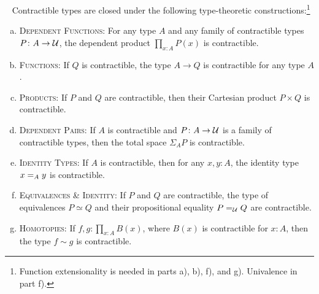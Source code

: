 \begin{thm}\fe\ \ua\label{thm:contractible-types}
    Contractible types are closed under the following type-theoretic constructions:\footnote{Function extensionality is needed in parts a), b), f), and g). Univalence in part f).}
    \begin{enumerate}[a),font=\upshape]
        \item \textsc{\upshape Dependent Functions:} For any type\/ $A$ and any family of contractible types\/ $P\colon A\to\univ$, the dependent product\/ $\prod_{x\colon A}P(x)$ is contractible. 
        
        \item \textsc{\upshape Functions:} If\/ $Q$ is contractible, the type\/ $A\to Q$ is contractible for any type\/ $A$.
        
        \item \textsc{\upshape Products:} If\/ $P$ and\/ $Q$ are contractible, then their Cartesian product\/ $P\times Q$ is contractible.
        
        \item \textsc{\upshape Dependent Pairs:} If\/ $A$ is contractible and\/ $P\colon A\to\univ$ is a family of contractible types, then the total space\/ $\Sigma_AP$ is contractible.
        
        \item \textsc{\upshape Identity Types:} If\/ $A$ is contractible, then for any\/ $x,y\colon A$, the identity type\/ $x\mathrel{=_{A}} y$ is contractible.
        
        \item \textsc{\upshape Equivalences \& Identity:} If\/ $P$ and\/ $Q$ are contractible, the type of equivalences\/ $P\simeq Q$ and their propositional equality\/ $P\mathrel{=_{\mathcal U}}Q$ are contractible.

        \item \textsc{\upshape Homotopies:} If\/ $f,g\colon\prod_{x\colon A}B(x)$, where\/ $B(x)$ is contractible for\/ $x\colon A$, then the type\/ $f\sim g$ is contractible.

    \end{enumerate}
\end{thm}

